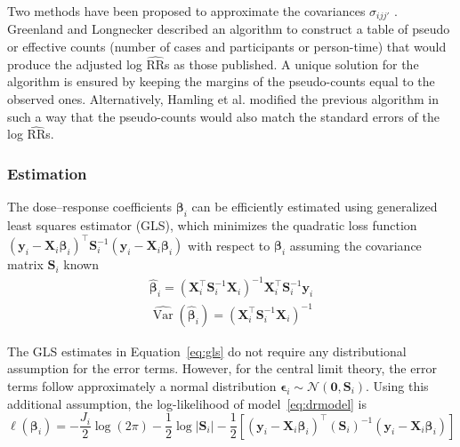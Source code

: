 \documentclass[11pt,a4paper,twoside,openany]{book}\usepackage{knitr}
\DeclareMathOperator{\Var}{Var}
\begin{document}
{{\noindent Two methods have been proposed to approximate the covariances $\sigma_{ijj'}$ \citep{greenland1992methods, hamling2008facilitating}. Greenland and Longnecker described an algorithm to construct a table of pseudo or effective counts (number of cases and participants or person-time) that would produce the adjusted log $\widehat{\mathrm{RR}}$s as those published. A unique solution for the algorithm is ensured by keeping the margins of the pseudo-counts equal to the observed ones. Alternatively, Hamling et al. modified the previous algorithm in such a way that the pseudo-counts would also match the standard errors of the log $\widehat{\mathrm{RR}}$s. 

\subsubsection*{Estimation}

The dose--response coefficients $\boldsymbol{\beta}_i$ can be efficiently estimated using generalized least squares estimator (GLS), which minimizes the quadratic loss function $\left(\mathbf{y}_i- \mathbf{X}_i \boldsymbol{\beta}_i \right)^\top \mathbf{S}_i^{-1} \left(\mathbf{y}_i- \mathbf{X}_i \boldsymbol{\beta}_i \right)$ with respect to $\boldsymbol{\beta}_i$ assuming the covariance matrix $\mathbf{S}_i$ known
\begin{equation}
\begin{gathered}
\boldsymbol{\hat \beta}_i = ( \mathbf{X}_i^\top  \mathbf{S}_i^{-1} \mathbf{X}_i)^{-1} \mathbf{X}_i^\top  \mathbf{S}_i^{-1} \mathbf{y}_i \\ 
\widehat{\Var} \left( \boldsymbol{\hat \beta}_i \right) = ( \mathbf{X}_i^\top \mathbf{S}_i^{-1} \mathbf{X}_i)^{-1}
\end{gathered}
\label{eq:gls}
\end{equation}

\noindent The GLS estimates in Equation~\ref{eq:gls} do not require any distributional assumption for the error terms. However, for the central limit theory, the error terms follow approximately a normal distribution $\boldsymbol{\epsilon}_i \sim \mathcal{N}\left(\mathbf{0}, \mathbf{S}_i \right)$. 
Using this additional assumption, the log-likelihood of model~\ref{eq:drmodel} is
\begin{equation}
\ell\left(\boldsymbol{\beta}_i\right) = -\frac{J_i}{2}\log\left(2\pi\right) - \frac{1}{2}\log|\mathbf{S}_i| - \frac{1}{2} \left[\left(\mathbf{y}_i- \mathbf{X}_i \boldsymbol{\beta}_i \right)^\top \left( \mathbf{S}_i \right)^{-1} \left(\mathbf{y}_i- \mathbf{X}_i \boldsymbol{\beta}_i \right) \right]
\label{eq:drmodel_logLik}
\end{equation}

}}
\end{document}
